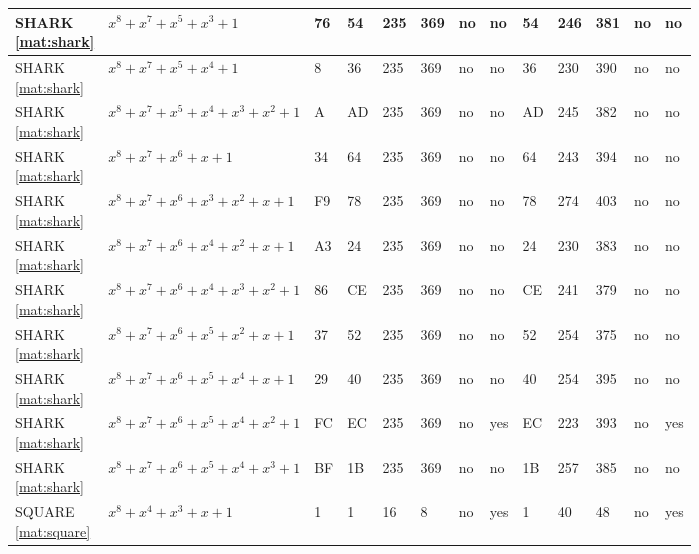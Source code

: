 \begin{tiny}
\begin{longtable}{|l|l|l|l|l|l|l|l|l|l|l|l|l|}
\shortstack{SHARK \\ \eqref{mat:shark}} & $x^8 + x^7 + x^5 + x^3 + 1$ & 76 & 54 & 235 & 369 & no & no & 54 & 246 & 381 & no & no \\ \hline
\shortstack{SHARK \\ \eqref{mat:shark}} & $x^8 + x^7 + x^5 + x^4 + 1$ & 8 & 36 & 235 & 369 & no & no & 36 & 230 & 390 & no & no \\ \hline
\shortstack{SHARK \\ \eqref{mat:shark}} & $x^8 + x^7 + x^5 + x^4 + x^3 + x^2 + 1$ & A & AD & 235 & 369 & no & no & AD & 245 & 382 & no & no \\ \hline
\shortstack{SHARK \\ \eqref{mat:shark}} & $x^8 + x^7 + x^6 + x + 1$ & 34 & 64 & 235 & 369 & no & no & 64 & 243 & 394 & no & no \\ \hline
\shortstack{SHARK \\ \eqref{mat:shark}} & $x^8 + x^7 + x^6 + x^3 + x^2 + x + 1$ & F9 & 78 & 235 & 369 & no & no & 78 & 274 & 403 & no & no \\ \hline
\shortstack{SHARK \\ \eqref{mat:shark}} & $x^8 + x^7 + x^6 + x^4 + x^2 + x + 1$ & A3 & 24 & 235 & 369 & no & no & 24 & 230 & 383 & no & no \\ \hline
\shortstack{SHARK \\ \eqref{mat:shark}} & $x^8 + x^7 + x^6 + x^4 + x^3 + x^2 + 1$ & 86 & CE & 235 & 369 & no & no & CE & 241 & 379 & no & no \\ \hline
\shortstack{SHARK \\ \eqref{mat:shark}} & $x^8 + x^7 + x^6 + x^5 + x^2 + x + 1$ & 37 & 52 & 235 & 369 & no & no & 52 & 254 & 375 & no & no \\ \hline
\shortstack{SHARK \\ \eqref{mat:shark}} & $x^8 + x^7 + x^6 + x^5 + x^4 + x + 1$ & 29 & 40 & 235 & 369 & no & no & 40 & 254 & 395 & no & no \\ \hline
\shortstack{SHARK \\ \eqref{mat:shark}} & $x^8 + x^7 + x^6 + x^5 + x^4 + x^2 + 1$ & FC & EC & 235 & 369 & no & yes & EC & 223 & 393 & no & yes \\ \hline
\shortstack{SHARK \\ \eqref{mat:shark}} & $x^8 + x^7 + x^6 + x^5 + x^4 + x^3 + 1$ & BF & 1B & 235 & 369 & no & no & 1B & 257 & 385 & no & no \\ \hline
\shortstack{SQUARE \\ \eqref{mat:square}} & $x^8 + x^4 + x^3 + x + 1$ & 1 & 1 & 16 & 8 & no & yes & 1 & 40 & 48 & no & yes \\ \hline

\end{longtable}
\end{tiny}
